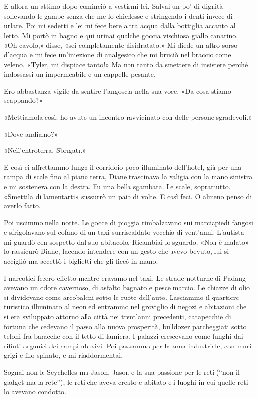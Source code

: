 E allora un attimo dopo cominciò a vestirmi lei. Salvai un po' di
dignità sollevando le gambe senza che me lo chiedesse e stringendo i
denti invece di urlare. Poi mi sedetti e lei mi fece bere altra acqua
dalla bottiglia accanto al letto. Mi portò in bagno e qui urinai qualche
goccia vischiosa giallo canarino. «Oh cavolo,» disse, «sei completamente
disidratato.» Mi diede un altro sorso d'acqua e mi fece un'iniezione di
analgesico che mi bruciò nel braccio come veleno. «Tyler, mi dispiace
tanto!» Ma non tanto da smettere di insistere perché indossassi un
impermeabile e un cappello pesante.

Ero abbastanza vigile da sentire l'angoscia nella sua voce. «Da cosa
stiamo scappando?»

«Mettiamola così: ho avuto un incontro ravvicinato con delle persone
sgradevoli.»

«Dove andiamo?»

«Nell'entroterra. Sbrigati.»

E così ci affrettammo lungo il corridoio poco illuminato dell'hotel, giù
per una rampa di scale fino al piano terra, Diane trascinava la valigia
con la mano sinistra e mi sosteneva con la destra. Fu una bella
sgambata. Le scale, soprattutto. «Smettila di lamentarti» sussurrò un
paio di volte. E così feci. O almeno penso di averlo fatto.

Poi uscimmo nella notte. Le gocce di pioggia rimbalzavano sui
marciapiedi fangosi e sfrigolavano sul cofano di un taxi surriscaldato
vecchio di vent'anni. L'autista mi guardò con sospetto dal suo
abitacolo. Ricambiai lo sguardo. «Non è malato» lo rassicurò Diane,
facendo intendere con un gesto che avevo bevuto, lui si accigliò ma
accettò i biglietti che gli ficcò in mano.

I narcotici fecero effetto mentre eravamo nel taxi. Le strade notturne
di Padang avevano un odore cavernoso, di asfalto bagnato e pesce marcio.
Le chiazze di olio si dividevano come arcobaleni sotto le ruote
dell'auto. Lasciammo il quartiere turistico illuminato al neon ed
entrammo nel groviglio di negozi e abitazioni che si era sviluppato
attorno alla città nei trent'anni precedenti, catapecchie di fortuna che
cedevano il passo alla nuova prosperità, bulldozer parcheggiati sotto
teloni fra baracche con il tetto di lamiera. I palazzi crescevano come
funghi dai rifiuti organici dei campi abusivi. Poi passammo per la zona
industriale, con muri grigi e filo spinato, e mi riaddormentai.

Sognai non le Seychelles ma Jason. Jason e la sua passione per le reti
(``non il gadget ma la rete''), le reti che aveva creato e abitato e i
luoghi in cui quelle reti lo avevano condotto.